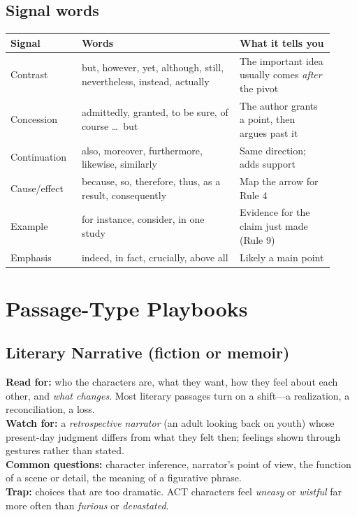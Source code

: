 \documentclass[11pt]{article}
\begin{document}
\subsection{Signal words}
\begin{center}
\small
\begin{tabular}{@{}p{0.2\linewidth}p{0.45\linewidth}p{0.27\linewidth}@{}}
\toprule
\textbf{Signal} & \textbf{Words} & \textbf{What it tells you}\\
\midrule
Contrast & but, however, yet, although, still, nevertheless, instead, actually & The important idea usually comes \emph{after} the pivot\\
Concession & admittedly, granted, to be sure, of course \dots\ but & The author grants a point, then argues past it\\
Continuation & also, moreover, furthermore, likewise, similarly & Same direction; adds support\\
Cause/effect & because, so, therefore, thus, as a result, consequently & Map the arrow for Rule 4\\
Example & for instance, consider, in one study & Evidence for the claim just made (Rule 9)\\
Emphasis & indeed, in fact, crucially, above all & Likely a main point\\
\bottomrule
\end{tabular}
\end{center}

\section{Passage-Type Playbooks}

\subsection{Literary Narrative (fiction or memoir)}
\textbf{Read for:} who the characters are, what they want, how they feel about each other, and \emph{what changes}. Most literary passages turn on a shift---a realization, a reconciliation, a loss.\\
\textbf{Watch for:} a \emph{retrospective narrator} (an adult looking back on youth) whose present-day judgment differs from what they felt then; feelings shown through gestures rather than stated.\\
\textbf{Common questions:} character inference, narrator's point of view, the function of a scene or detail, the meaning of a figurative phrase.\\
\textbf{Trap:} choices that are too dramatic. ACT characters feel \emph{uneasy} or \emph{wistful} far more often than \emph{furious} or \emph{devastated}.
\end{document}
